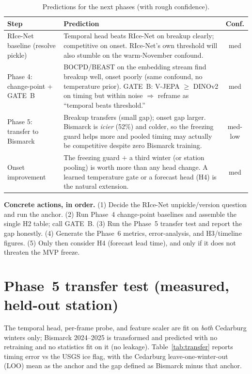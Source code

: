 \documentclass[11pt]{article}
\begin{document}
\begin{table}[h]\centering\small
\caption{Predictions for the next phases (with rough confidence).}\label{tab:pred}
\begin{tabular}{p{}p{}c}
\toprule
Step & Prediction & Conf. \\
\midrule
RIce-Net baseline (resolve pickle) & Temporal head beats RIce-Net on breakup clearly; competitive
on onset. RIce-Net's own threshold will also stumble on the warm-November confound. & med \\
Phase 4: change-point + GATE~B & BOCPD/BEAST on the embedding stream find breakup well, onset
poorly (same confound, no temperature prior). GATE~B: V-JEPA $\geq$ DINOv2 on timing but within
noise $\Rightarrow$ reframe as ``temporal beats threshold.'' & med \\
Phase 5: transfer to Bismarck & Breakup transfers (small gap); onset gap larger. Bismarck is
\emph{icier} (52\%) and colder, so the freezing guard helps more and pooled timing may actually be
competitive despite zero Bismarck training. & med-low \\
Onset improvement & The freezing guard $+$ a third winter (or station pooling) is worth more than
any head change. A learned temperature gate or a forecast head (H4) is the natural extension. & med \\
\bottomrule
\end{tabular}
\end{table}

\textbf{Concrete actions, in order.} (1) Decide the RIce-Net unpickle/version question and run the
anchor. (2) Run Phase~4 change-point baselines and assemble the single H2 table; call GATE~B.
(3) Run the Phase~5 transfer test and report the gap honestly. (4) Generate the Phase~6 metrics,
error-analysis, and H3/timeline figures. (5) Only then consider H4 (forecast lead time), and only
if it does not threaten the MVP freeze.

\section*{Phase~5 transfer test (measured, held-out station)}
The temporal head, per-frame probe, and feature scaler are fit on \emph{both} Cedarburg winters
only; Bismarck 2024--2025 is transformed and predicted with no retraining and no statistics fit on
it (no leakage). Table~\ref{tab:transfer} reports timing error vs the USGS ice flag, with the
Cedarburg leave-one-winter-out (LOO) mean as the anchor and the gap defined as Bismarck minus that
anchor.
\end{document}
